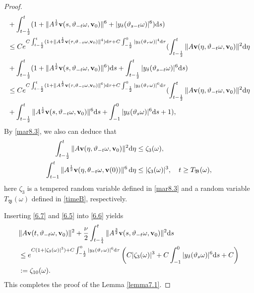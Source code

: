 \documentclass{elsarticle}
\theoremstyle{definition}
\numberwithin{equation}{section}
\renewcommand{\d}{{\rm{d}}}
\begin{document}
\begin{proof}
\begin{align}
&+\int_{t-\frac{1}{2}}^t(1+\|A^\frac{1}{2}\textbf{v}(s,\vartheta_{-t}\omega,\textbf{v}_0)\|^6+|y_\delta(\vartheta_{s-t}\omega)|^6)\d s)\nonumber\\
&\leq Ce^{C\int_{t-\frac12}^t(1+\|A^\frac12\textbf{v}(\tau,\vartheta_{-t}\omega,\textbf{v}_0)\|^4)\d\tau
+C\int_{-\frac12}^0|y_\delta(\vartheta_{\tau}\omega)|^4\d\tau}
(\int_{t-\frac{1}{2}}^{t}\|A\textbf{v}(\eta,\vartheta_{-t}\omega,\textbf{v}_0)\|^2\d \eta\nonumber\\
&+\int_{t-\frac{1}{2}}^t(1+\|A^\frac{1}{2}\textbf{v}(s,\vartheta_{-t}\omega,\textbf{v}_0)\|^6)\d s
+\int_{t-\frac{1}{2}}^t|y_\delta(\vartheta_{s-t}\omega)|^6\d s)\nonumber\\
&\leq Ce^{C\int_{t-\frac12}^t(1+\|A^\frac12\textbf{v}(\tau,\vartheta_{-t}\omega,\textbf{v}_0)\|^6)\d\tau
+C\int_{-\frac12}^0|y_\delta(\vartheta_{\tau}\omega)|^6\d\tau}
(\int_{t-\frac{1}{2}}^{t}\|A\textbf{v}(\eta,\vartheta_{-t}\omega,\textbf{v}_0)\|^2\d \eta\nonumber\\
&+\int_{t-\frac{1}{2}}^t\|A^\frac{1}{2}\textbf{v}(s,\vartheta_{-t}\omega,\textbf{v}_0)\|^6\d s
+\int_{-1}^0|y_\delta(\vartheta_{s}\omega)|^6\d s+1),
\end{align}
By \eqref{mar8.3}, we also can deduce that
\begin{align}
\int_{t-\frac{1}{2}}^{t}\|A\textbf{v}(\eta,\vartheta_{-t}\omega,\textbf{v}_0)\|^2\d \eta&\leq    \zeta_3(\omega) ,\label{6.7}\\
  \int_{t-1}^t\|A^{\frac12}\textbf{v}(\eta,\theta_{-t}\omega,\textbf{v}(0))\|^6 \, \d \eta
&  \leq    |\zeta_3(\omega)|^3 ,  \quad t\geq T_{\mathfrak B} (\omega) ,\label{6.5}
\end{align}
here    $ \zeta_3 $ is a tempered random variable defined in \eqref{mar8.3} and  a random variable $T_{\mathfrak B} (\omega)$ defined in \eqref{timeB}, respectively.

Inserting \eqref{6.7} and \eqref{6.5} into \eqref{6.6} yields
\begin{align}\label{6.17}
&\|A\textbf{v}(t,\vartheta_{-t}\omega,\textbf{v}_0)\|^2+\frac{\nu}{2}\int_{t-\frac{1}{4}}^t
\|A^\frac{3}{2}\textbf{v}(s,\vartheta_{-t}\omega,\textbf{v}_0)\|^2 \d s\nonumber\\
&\leq
e^{C
(1+|\zeta_3(\omega)|^3)+C
\int_{-\frac{1}{2}}^0
|y_\delta(\vartheta_\tau\omega)|^6 \d\tau}\left(C|\zeta_3(\omega)|^3+C\int_{-1}^0
|y_\delta(\vartheta_{s}\omega)|^6\d s+C\right)\nonumber\\
&:=\zeta_{10}(\omega).
\end{align}
This completes the proof of the Lemma \ref{lemma7.1}.
\end{proof}
\end{document}
